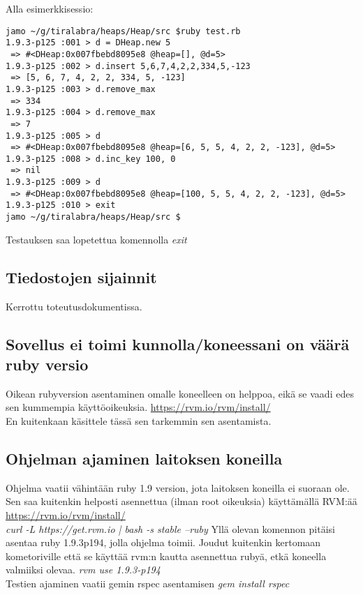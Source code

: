 \documentclass[a4paper,12pt]{article}
\begin{document}
Alla esimerkkisessio:
\begin{verbatim}
jamo ~/g/tiralabra/heaps/Heap/src $ruby test.rb 
1.9.3-p125 :001 > d = DHeap.new 5
 => #<DHeap:0x007fbebd8095e8 @heap=[], @d=5> 
1.9.3-p125 :002 > d.insert 5,6,7,4,2,2,334,5,-123
 => [5, 6, 7, 4, 2, 2, 334, 5, -123] 
1.9.3-p125 :003 > d.remove_max
 => 334 
1.9.3-p125 :004 > d.remove_max
 => 7 
1.9.3-p125 :005 > d
 => #<DHeap:0x007fbebd8095e8 @heap=[6, 5, 5, 4, 2, 2, -123], @d=5> 
1.9.3-p125 :008 > d.inc_key 100, 0
 => nil 
1.9.3-p125 :009 > d
 => #<DHeap:0x007fbebd8095e8 @heap=[100, 5, 5, 4, 2, 2, -123], @d=5> 
1.9.3-p125 :010 > exit
jamo ~/g/tiralabra/heaps/Heap/src $
\end{verbatim}
Testauksen saa lopetettua komennolla \emph{exit}

\subsection{Tiedostojen sijainnit}
Kerrottu toteutusdokumentissa.

\subsection{Sovellus ei toimi kunnolla/koneessani on väärä ruby versio}
Oikean rubyversion asentaminen omalle koneelleen on helppoa, eikä se vaadi edes sen kummempia käyttöoikeuksia. \url{https://rvm.io/rvm/install/} \\
En kuitenkaan käsittele tässä sen tarkemmin sen asentamista.
\subsection{Ohjelman ajaminen laitoksen koneilla}
Ohjelma vaatii vähintään ruby 1.9 version, jota laitoksen koneilla ei suoraan ole. Sen saa kuitenkin helposti asennettua (ilman root oikeuksia) käyttämällä RVM:ää
\url{https://rvm.io/rvm/install/}
\emph{\\curl -L https://get.rvm.io | bash -s stable --ruby}
Yllä olevan komennon pitäisi asentaa ruby 1.9.3p194, jolla ohjelma toimii.
Joudut kuitenkin kertomaan kometoriville että se käyttää rvm:n kautta asennettua rubyä, etkä koneella valmiiksi olevaa. \emph{rvm use 1.9.3-p194} 
\\
Testien ajaminen vaatii gemin rspec asentamisen \emph{gem install rspec}
\end{document}
